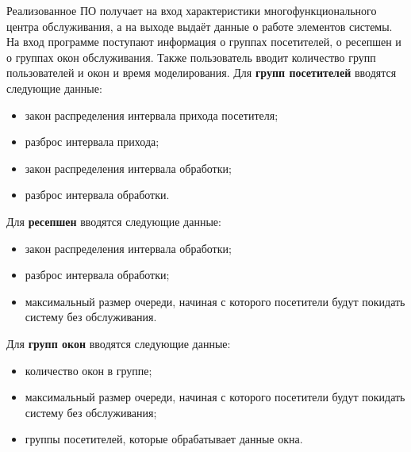Реализованное ПО получает на вход характеристики многофункционального центра обслуживания, а на выходе выдаёт данные о работе элементов системы. На вход программе поступают информация о группах посетителей, о ресепшен и о группах окон обслуживания. Также пользователь вводит количество групп пользователей и окон и время моделирования.
Для \textbf{групп посетителей} вводятся следующие данные: 
\begin{itemize}[label=---]
	\item закон распределения интервала прихода посетителя;
	\item разброс интервала прихода;
	\item закон распределения интервала обработки;
	\item разброс интервала обработки.
\end{itemize}
Для \textbf{ресепшен} вводятся следующие данные: 
\begin{itemize}[label=---]
	\item закон распределения интервала обработки;
	\item разброс интервала обработки;
	\item максимальный размер очереди, начиная с которого посетители будут покидать систему без обслуживания.
\end{itemize}
Для \textbf{групп окон} вводятся следующие данные: 
\begin{itemize}[label=---]
	\item количество окон в группе;
	\item максимальный размер очереди, начиная с которого посетители будут покидать систему без обслуживания;
	\item группы посетителей, которые обрабатывает данные окна.
\end{itemize}

